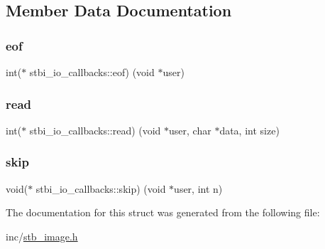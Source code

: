 \subsection{Member Data Documentation}
\mbox{\label{structstbi__io__callbacks_a319639db2f76e715eed7a7a974136832}} 
\subsubsection{\texorpdfstring{eof}{eof}}
{\footnotesize\ttfamily int($\ast$ stbi\+\_\+io\+\_\+callbacks\+::eof) (void $\ast$user)}

\mbox{\label{structstbi__io__callbacks_a623e46b3a2a019611601409926283a88}} 
\subsubsection{\texorpdfstring{read}{read}}
{\footnotesize\ttfamily int($\ast$ stbi\+\_\+io\+\_\+callbacks\+::read) (void $\ast$user, char $\ast$data, int size)}

\mbox{\label{structstbi__io__callbacks_a257aac5480a90a6c4b8fbe86c1b01068}} 
\subsubsection{\texorpdfstring{skip}{skip}}
{\footnotesize\ttfamily void($\ast$ stbi\+\_\+io\+\_\+callbacks\+::skip) (void $\ast$user, int n)}



The documentation for this struct was generated from the following file\+:\begin{DoxyCompactItemize}
\item 
inc/\hyperlink{stb__image_8h}{stb\+\_\+image.\+h}\end{DoxyCompactItemize}
